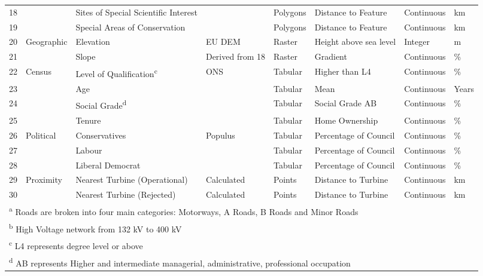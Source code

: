 \documentclass[a4paper,]{article}
\theoremstyle{definition}
\theoremstyle{definition}
\theoremstyle{definition}
\theoremstyle{remark}
\begin{document}
\begin{landscape}
\begin{table}[t]
{\begin{tabular}{rlllllll}
18 &  & Sites of Special Scientific Interest &  & Polygons & Distance to Feature & Continuous & km\\
19 &  & Special Areas of Conservation &  & Polygons & Distance to Feature & Continuous & km\\
20 & Geographic & Elevation & EU DEM & Raster & Height above sea level & Integer & m\\
21 &  & Slope & Derived from 18 & Raster & Gradient & Continuous & \%\\
22 & Census & Level of Qualification\textsuperscript{c} & ONS & Tabular & Higher than L4 & Continuous & \%\\
23 &  & Age &  & Tabular & Mean & Continuous & Years\\
24 &  & Social Grade\textsuperscript{d} &  & Tabular & Social Grade AB & Continuous & \%\\
25 &  & Tenure &  & Tabular & Home Ownership & Continuous & \%\\
26 & Political & Conservatives & Populus & Tabular & Percentage of Council & Continuous & \%\\
27 &  & Labour &  & Tabular & Percentage of Council & Continuous & \%\\
28 &  & Liberal Democrat &  & Tabular & Percentage of Council & Continuous & \%\\
29 & Proximity & Nearest Turbine (Operational) & Calculated & Points & Distance to Turbine & Continuous & km\\
30 &  & Nearest Turbine (Rejected) & Calculated & Points & Distance to Turbine & Continuous & km\\
\bottomrule
\multicolumn{8}{l}{\textsuperscript{a} Roads are broken into four main categories: Motorways, A Roads, B Roads and Minor Roads}\\
\multicolumn{8}{l}{\textsuperscript{b} High Voltage network from 132 kV to 400 kV}\\
\multicolumn{8}{l}{\textsuperscript{c} L4 represents degree level or above}\\
\multicolumn{8}{l}{\textsuperscript{d} AB represents Higher and intermediate managerial, administrative, professional occupation}\\
\end{tabular}}
\end{table}
\end{landscape}


\end{document}
